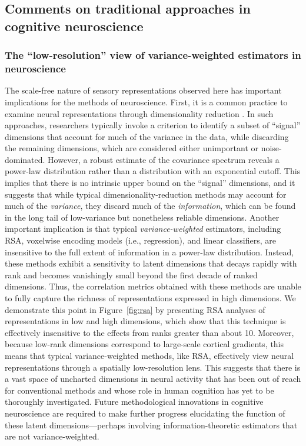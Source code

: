 \documentclass[10pt]{article}
\begin{document}
\subsection{Comments on traditional approaches in cognitive neuroscience}\label{comments-on-traditional-approaches-in-cognitive-neuroscience}

\subsubsection{The ``low-resolution'' view of variance-weighted estimators in neuroscience}\label{the-low-resolution-view-of-variance-weighted-estimators-in-neuroscience}

The scale-free nature of sensory representations observed here has important implications for the methods of neuroscience. First, it is a common practice to examine neural representations through dimensionality reduction \autocite{Cunningham2014,Huth2012,Haxby2011,Khosla2022,Lehky2014}. In such approaches, researchers typically invoke a criterion to identify a subset of ``signal'' dimensions that account for much of the variance in the data, while discarding the remaining dimensions, which are considered either unimportant or noise-dominated. However, a robust estimate of the covariance spectrum reveals a power-law distribution rather than a distribution with an exponential cutoff. This implies that there is no intrinsic upper bound on the ``signal'' dimensions, and it suggests that while typical dimensionality-reduction methods may account for much of the \emph{variance}, they discard much of the \emph{information}, which can be found in the long tail of low-variance but nonetheless reliable dimensions. Another important implication is that typical \emph{variance-weighted} estimators, including RSA, voxelwise encoding models (i.e., regression), and linear classifiers, are insensitive to the full extent of information in a power-law distribution. Instead, these methods exhibit a sensitivity to latent dimensions that decays rapidly with rank and becomes vanishingly small beyond the first decade of ranked dimensions. Thus, the correlation metrics obtained with these methods are unable to fully capture the richness of representations expressed in high dimensions. We demonstrate this point in Figure~\ref{fig:rsa} by presenting RSA analyses of representations in low and high dimensions, which show that this technique is effectively insensitive to the effects from ranks greater than about 10. Moreover, because low-rank dimensions correspond to large-scale cortical gradients, this means that typical variance-weighted methods, like RSA, effectively view neural representations through a spatially low-resolution lens. This suggests that there is a vast space of uncharted dimensions in neural activity that has been out of reach for conventional methods and whose role in human cognition has yet to be thoroughly investigated. Future methodological innovations in cognitive neuroscience are required to make further progress elucidating the function of these latent dimensions---perhaps involving information-theoretic estimators that are not variance-weighted.
\end{document}
